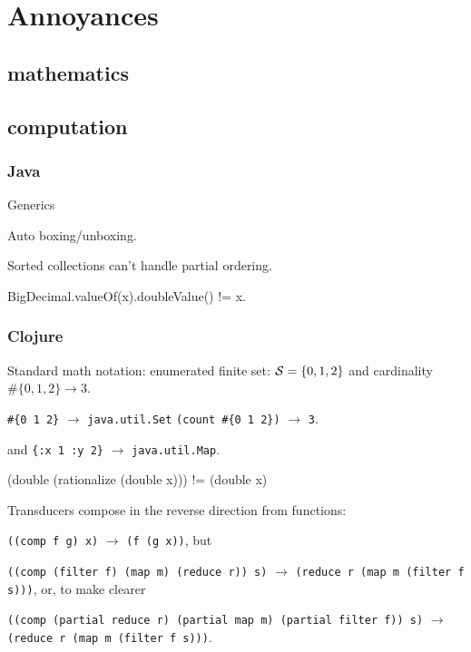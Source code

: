 \chapter{Annoyances}

\section{mathematics}

\section{computation}

\subsection{Java}
\lstset{language=Java}

Generics

Auto boxing/unboxing.

Sorted collections can't handle partial ordering.

BigDecimal.valueOf(x).doubleValue() != x.

\subsection{Clojure}
\lstset{language=Clojure}

Standard math notation: 
enumerated finite set: $\mathcal{S} = \{0, 1, 2\}$ 
and cardinality $\#\{0, 1, 2\}
\rightarrow 3$.

\lstinline|#{0 1 2}| $\rightarrow$ \lstinline|java.util.Set|
\lstinline|(count #{0 1 2})| $\rightarrow$
\lstinline|3|.

and
\lstinline|{:x 1 :y 2}| $\rightarrow$ \lstinline|java.util.Map|.

(double (rationalize (double x))) != (double x)

Transducers compose in the reverse direction from functions:

\lstinline|((comp f g) x)| $\rightarrow$
\lstinline|(f (g x))|, but

\lstinline|((comp (filter f) (map m) (reduce r)) s)| $\rightarrow$
\lstinline|(reduce r (map m (filter f s)))|, or, to make clearer


\lstinline|((comp (partial reduce r) (partial map m) (partial filter f)) s)| 
$\rightarrow$ \lstinline|(reduce r (map m (filter f s)))|.
